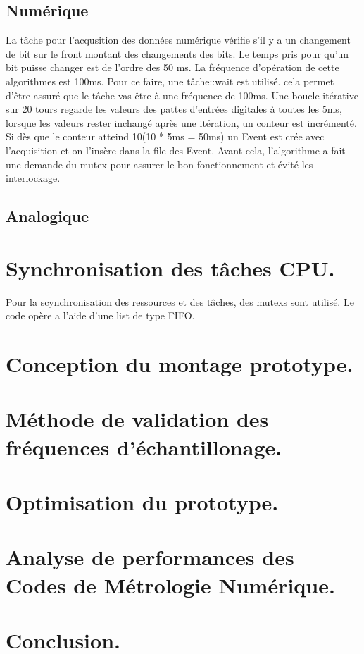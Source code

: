 \documentclass[12pt]{article}
\begin{document}
\subsection{Numérique}
La tâche pour l'acqusition des données numérique vérifie s'il y a un changement de bit sur le front montant des changements des bits. Le temps pris pour qu'un bit puisse changer est de l'ordre des 50 ms. La fréquence d'opération de cette algorithmes est 100ms. Pour ce faire, une tâche::wait est utilisé. cela permet d'être assuré que le tâche vas être à une fréquence de 100ms. Une boucle itérative sur 20 tours regarde les valeurs des pattes d'entrées digitales à toutes les 5ms, lorsque les valeurs rester inchangé après une itération, un conteur est incrémenté. Si dès que le conteur atteind 10(10 * 5ms = 50ms) un Event est crée avec l'acquisition et on l'insère dans la file des Event. Avant cela, l'algorithme a fait une demande du mutex pour assurer le bon fonctionnement et évité les interlockage.

\subsection{Analogique}

\section{Synchronisation des tâches CPU.}
Pour la scynchronisation des ressources et des tâches, des mutexs sont utilisé. Le code opère a l'aide d'une list de type FIFO.
\section{Conception du montage prototype.}
\section{Méthode de validation des fréquences d'échantillonage.}
\section{Optimisation du prototype.}
\section{Analyse de performances des Codes de Métrologie Numérique.}
\section{Conclusion.}
\end{document}
